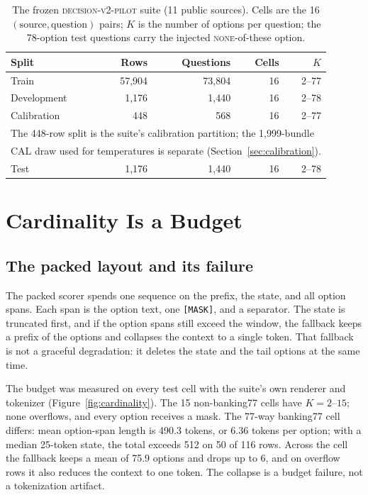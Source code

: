 \begin{table}[t]
\centering
\footnotesize
\caption{The frozen \textsc{decision-v2-pilot} suite (11 public sources). Cells are the 16
$(\text{source},\text{question})$ pairs; $K$ is the number of options per question; the 78-option test questions carry the injected \textsc{none}-of-these option.}
\label{tab:dataset}
\begin{tabular}{lrrrr}
\toprule
Split & Rows & Questions & Cells & $K$ \\
\midrule
Train & 57{,}904 & 73{,}804 & 16 & 2--77 \\
Development & 1{,}176 & 1{,}440 & 16 & 2--78 \\
Calibration & 448 & 568 & 16 & 2--77 \\
\midrule
\multicolumn{5}{l}{\footnotesize The 448-row split is the suite's calibration partition; the 1{,}999-bundle}\\
\multicolumn{5}{l}{\footnotesize CAL draw used for temperatures is separate (Section~\ref{sec:calibration}).}\\
Test & 1{,}176 & 1{,}440 & 16 & 2--78 \\
\bottomrule
\end{tabular}
\end{table}

\section{Cardinality Is a Budget}
\label{sec:cardinality}

\subsection{The packed layout and its failure}
The packed scorer spends one sequence on the prefix, the state, and all option spans. Each span is
the option text, one \texttt{[MASK]}, and a separator. The state is truncated first, and if the
option spans still exceed the window, the fallback keeps a prefix of the options and collapses
the context to a single token. That fallback is not a graceful degradation: it deletes the state
and the tail options at the same time.

The budget was measured on every test cell with the suite's own renderer and tokenizer
(Figure~\ref{fig:cardinality}). The 15 non-banking77 cells have $K=2$--$15$; none overflows, and
every option receives a mask. The 77-way banking77 cell differs: mean option-span length is 490.3
tokens, or 6.36 tokens per option; with a median 25-token state, the total exceeds 512 on 50 of
116 rows. Across the cell the fallback keeps a mean of 75.9 options and drops up to 6, and on
overflow rows it also reduces the context to one token. The collapse is a budget failure, not a
tokenization artifact.

